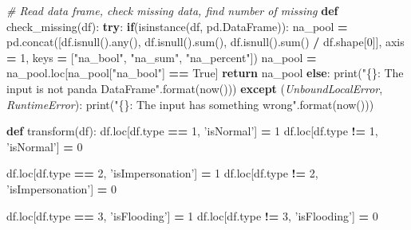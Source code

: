 \documentclass[]{book}
\newenvironment{Shaded}{\begin{snugshade}}{\end{snugshade}}
\newcommand{\KeywordTok}[1]{\textcolor[rgb]{0.13,0.29,0.53}{\textbf{#1}}}
\newcommand{\DecValTok}[1]{\textcolor[rgb]{0.00,0.00,0.81}{#1}}
\newcommand{\SpecialCharTok}[1]{\textcolor[rgb]{0.00,0.00,0.00}{#1}}
\newcommand{\StringTok}[1]{\textcolor[rgb]{0.31,0.60,0.02}{#1}}
\newcommand{\CommentTok}[1]{\textcolor[rgb]{0.56,0.35,0.01}{\textit{#1}}}
\newcommand{\VariableTok}[1]{\textcolor[rgb]{0.00,0.00,0.00}{#1}}
\newcommand{\ControlFlowTok}[1]{\textcolor[rgb]{0.13,0.29,0.53}{\textbf{#1}}}
\newcommand{\OperatorTok}[1]{\textcolor[rgb]{0.81,0.36,0.00}{\textbf{#1}}}
\newcommand{\BuiltInTok}[1]{#1}
\newcommand{\PreprocessorTok}[1]{\textcolor[rgb]{0.56,0.35,0.01}{\textit{#1}}}
\newcommand{\NormalTok}[1]{#1}
\begin{document}
\begin{Shaded}
\begin{Highlighting}[]
{\CommentTok{# Read data frame, check missing data, find number of missing}
\KeywordTok{def}\NormalTok{ check_missing(df):}
    \ControlFlowTok{try}\NormalTok{:}
        \ControlFlowTok{if}\NormalTok{(}\BuiltInTok{isinstance}\NormalTok{(df, pd.DataFrame)):}
\NormalTok{            na_pool }\OperatorTok{=}\NormalTok{ pd.concat([df.isnull().}\BuiltInTok{any}\NormalTok{(), df.isnull().}\BuiltInTok{sum}\NormalTok{(), df.isnull().}\BuiltInTok{sum}\NormalTok{() }\OperatorTok{/}\NormalTok{ df.shape[}\DecValTok{0}\NormalTok{]], axis }\OperatorTok{=} \DecValTok{1}\NormalTok{, keys }\OperatorTok{=}\NormalTok{ [}\StringTok{"na_bool"}\NormalTok{, }\StringTok{"na_sum"}\NormalTok{, }\StringTok{"na_percent"}\NormalTok{])}
\NormalTok{            na_pool }\OperatorTok{=}\NormalTok{ na_pool.loc[na_pool[}\StringTok{"na_bool"}\NormalTok{] }\OperatorTok{==}  \VariableTok{True}\NormalTok{]}
            \ControlFlowTok{return}\NormalTok{ na_pool}
        \ControlFlowTok{else}\NormalTok{:}
            \BuiltInTok{print}\NormalTok{(}\StringTok{"}\SpecialCharTok{\{\}}\StringTok{: The input is not panda DataFrame"}\NormalTok{.}\BuiltInTok{format}\NormalTok{(now()))}
    \ControlFlowTok{except}\NormalTok{ (}\PreprocessorTok{UnboundLocalError}\NormalTok{, }\PreprocessorTok{RuntimeError}\NormalTok{):}
        \BuiltInTok{print}\NormalTok{(}\StringTok{"}\SpecialCharTok{\{\}}\StringTok{: The input has something wrong"}\NormalTok{.}\BuiltInTok{format}\NormalTok{(now()))}

\KeywordTok{def}\NormalTok{ transform(df):}
\NormalTok{    df.loc[df.}\BuiltInTok{type} \OperatorTok{==} \DecValTok{1}\NormalTok{, }\StringTok{'isNormal'}\NormalTok{] }\OperatorTok{=} \DecValTok{1}
\NormalTok{    df.loc[df.}\BuiltInTok{type} \OperatorTok{!=} \DecValTok{1}\NormalTok{, }\StringTok{'isNormal'}\NormalTok{] }\OperatorTok{=} \DecValTok{0}

\NormalTok{    df.loc[df.}\BuiltInTok{type} \OperatorTok{==} \DecValTok{2}\NormalTok{, }\StringTok{'isImpersonation'}\NormalTok{] }\OperatorTok{=} \DecValTok{1}
\NormalTok{    df.loc[df.}\BuiltInTok{type} \OperatorTok{!=} \DecValTok{2}\NormalTok{, }\StringTok{'isImpersonation'}\NormalTok{] }\OperatorTok{=} \DecValTok{0}

\NormalTok{    df.loc[df.}\BuiltInTok{type} \OperatorTok{==} \DecValTok{3}\NormalTok{, }\StringTok{'isFlooding'}\NormalTok{] }\OperatorTok{=} \DecValTok{1}
\NormalTok{    df.loc[df.}\BuiltInTok{type} \OperatorTok{!=} \DecValTok{3}\NormalTok{, }\StringTok{'isFlooding'}\NormalTok{] }\OperatorTok{=} \DecValTok{0}

}
\end{Highlighting}
\end{Shaded}
\end{document}
